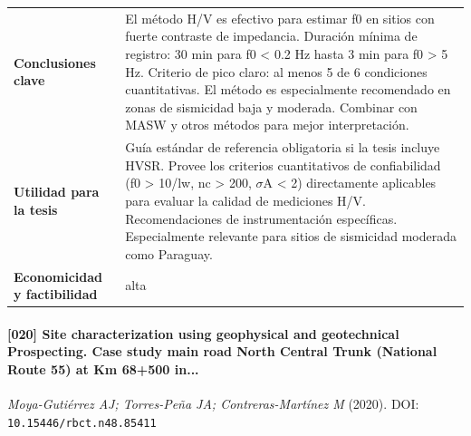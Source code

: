 \begin{center}
\begin{tabularx}{\textwidth}{@{}>{\bfseries}p{3.3cm} X@{}}
Conclusiones clave & El método H/V es efectivo para estimar f0 en sitios con fuerte contraste de impedancia. Duración mínima de registro: 30 min para f0 < 0.2 Hz hasta 3 min para f0 > 5 Hz. Criterio de pico claro: al menos 5 de 6 condiciones cuantitativas. El método es especialmente recomendado en zonas de sismicidad baja y moderada. Combinar con MASW y otros métodos para mejor interpretación. \\
Utilidad para la tesis & Guía estándar de referencia obligatoria si la tesis incluye HVSR. Provee los criterios cuantitativos de confiabilidad (f0 > 10/lw, nc > 200, $\sigma$A < 2) directamente aplicables para evaluar la calidad de mediciones H/V. Recomendaciones de instrumentación específicas. Especialmente relevante para sitios de sismicidad moderada como Paraguay. \\
Economicidad y factibilidad & alta \\
\bottomrule
\end{tabularx}
\end{center}

\paragraph{[020] Site characterization using geophysical and geotechnical Prospecting. Case study main road North Central Trunk (National Route 55) at Km 68+500 in...} \emph{Moya-Gutiérrez AJ; Torres-Peña JA; Contreras-Martínez M} (2020).
{\scriptsize DOI: \texttt{10.15446/rbct.n48.85411}}

